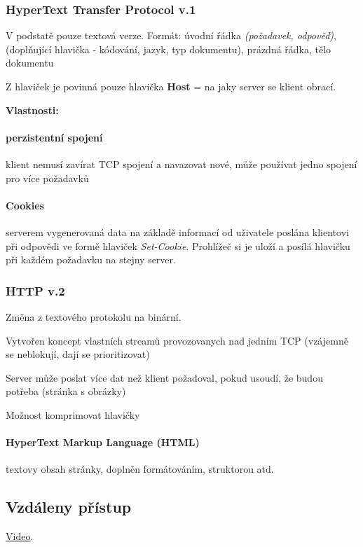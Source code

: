 \documentclass[10pt,a4paper]{article}
\begin{document}
\subsubsection{HyperText Transfer Protocol v.1}

V podstatě pouze textová verze. Formát: úvodní řádka \textit{(požadavek, odpověď)}, (doplňující hlavička - kódování, jazyk, typ dokumentu), prázdná řádka, tělo dokumentu

Z hlaviček je povinná pouze hlavička \textbf{Host} = na jaky server se klient obrací.

\textbf{Vlastnosti:}

\paragraph{perzistentní spojení} klient nemusí zavírat TCP spojení a navazovat nové, může používat jedno spojení pro více požadavků
\paragraph{Cookies} serverem vygenerovaná data na základě informací od uživatele poslána klientovi při odpovědi ve formě hlaviček \textit{Set-Cookie}. Prohlížeč si je uloží a posílá hlavičku při každém požadavku na stejny server. 

\subsubsection{HTTP v.2}

Změna z textového protokolu na binární. 

Vytvořen koncept vlastních streamů provozovanych nad jedním TCP (vzájemně se neblokují, dají se prioritizovat)

Server může poslat více dat než klient požadoval, pokud usoudí, že budou potřeba (stránka s obrázky)

Možnost komprimovat hlavičky

\paragraph{HyperText Markup Language (HTML)} textovy obsah stránky, doplněn formátováním, struktorou atd.

\subsection{Vzdáleny přístup}

\href{https://youtu.be/tZop-zjYkrU}{Video}.
\end{document}
